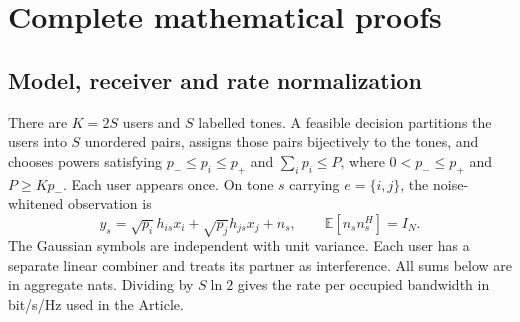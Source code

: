 \documentclass[10pt,letterpaper]{article}
\begin{document}
\FloatBarrier
\section{Complete mathematical proofs}
\label{supp:proofs}

\subsection{Model, receiver and rate normalization}
There are $K=2S$ users and $S$ labelled tones. A feasible decision partitions the users into $S$ unordered pairs, assigns those pairs bijectively to the tones, and chooses powers satisfying $p_-\le p_i\le p_+$ and $\sum_i p_i\le P$, where $0<p_-\le p_+$ and $P\ge Kp_-$. Each user appears once. On tone $s$ carrying $e=\{i,j\}$, the noise-whitened observation is
\begin{equation}
 y_s=\sqrt{p_i}h_{is}x_i+\sqrt{p_j}h_{js}x_j+n_s,
 \qquad \mathbb E[n_sn_s^H]=I_N.
 \label{supp:observation}
\end{equation}
The Gaussian symbols are independent with unit variance. Each user has a separate linear combiner and treats its partner as interference. All sums below are in aggregate nats. Dividing by $S\ln2$ gives the rate per occupied bandwidth in bit/s/Hz used in the Article.
\end{document}
